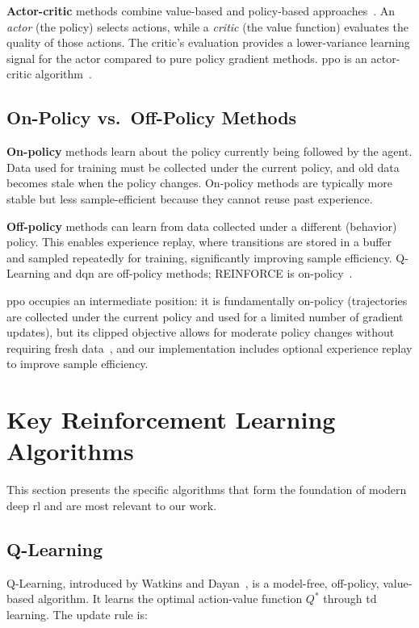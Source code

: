 \textbf{Actor-critic} methods combine value-based and policy-based approaches~\cite{sutton2018reinforcement}. An \textit{actor} (the policy) selects actions, while a \textit{critic} (the value function) evaluates the quality of those actions. The critic's evaluation provides a lower-variance learning signal for the actor compared to pure policy gradient methods. \gls{ppo} is an actor-critic algorithm~\cite{schulman2017ppo}.

\subsection{On-Policy vs.\ Off-Policy Methods}

\textbf{On-policy} methods learn about the policy currently being followed by the agent. Data used for training must be collected under the current policy, and old data becomes stale when the policy changes. On-policy methods are typically more stable but less sample-efficient because they cannot reuse past experience.

\textbf{Off-policy} methods can learn from data collected under a different (behavior) policy. This enables experience replay, where transitions are stored in a buffer and sampled repeatedly for training, significantly improving sample efficiency. Q-Learning and \gls{dqn} are off-policy methods; REINFORCE is on-policy~\cite{williams1992simple}.

\gls{ppo} occupies an intermediate position: it is fundamentally on-policy (trajectories are collected under the current policy and used for a limited number of gradient updates), but its clipped objective allows for moderate policy changes without requiring fresh data~\cite{schulman2017ppo}, and our implementation includes optional experience replay to improve sample efficiency.

\section{Key Reinforcement Learning Algorithms}

This section presents the specific algorithms that form the foundation of modern deep \gls{rl} and are most relevant to our work.

\subsection{Q-Learning}

Q-Learning, introduced by Watkins and Dayan~\cite{watkins1992qlearning}, is a model-free, off-policy, value-based algorithm. It learns the optimal action-value function $Q^*$ through \gls{td} learning. The update rule is:

